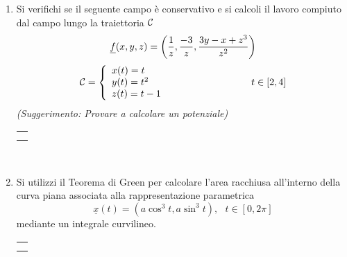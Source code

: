 \documentclass[12pt,a4paper]{report}\pagenumbering{roman}
\begin{document}
\begin{enumerate}
\item Si verifichi se il seguente campo \`e conservativo e si calcoli
il lavoro compiuto dal campo lungo la traiettoria ${\cal C}$
$$\underline{f}(x,y,z)=\left({1\over z},{-3\over z},{3y-x+z^3\over z^2}\right)$$
$${\cal C}=\left\{\begin{array}{ll}
x(t)=t\\ y(t)=t^2 \\ z(t)=t-1
\end{array}\right.\hspace{3cm}t\in[2,4]$$
{\it (Suggerimento: Provare a calcolare un potenziale)}

\hspace*{-3.5cm}\begin{tabular}{c}\hline\\\hspace*{16cm}\end{tabular}\\
\hspace*{-3.5cm}{\bf SVOLGIMENTO:}\pagebreak

\item Si utilizzi il Teorema di Green per calcolare l'area racchiusa all'interno
della curva piana associata alla rappresentazione parametrica
$$\underline{x}(t)=(a\cos^3 t ,a\sin^3 t),\ \ \  t\in[0,2\pi]$$
mediante un integrale curvilineo.

\hspace*{-3.5cm}\begin{tabular}{c}\hline\\\hspace*{16cm}\end{tabular}\\
\hspace*{-3.5cm}{\bf SVOLGIMENTO:}

\end{enumerate}
\end{document}
